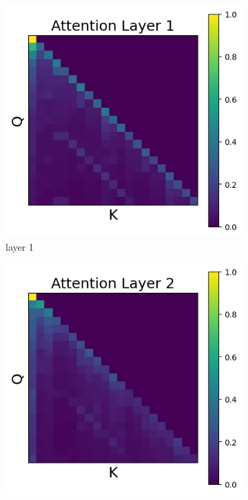 \documentclass[11pt]{article}
\begin{document}
\subsection{}\label{app:intervention2}
\begin{figure}[t]
  \begin{subfigure}[t]{0.24\textwidth}
    \centering
    \includegraphics[width=1.4\columnwidth]{figures/intervention2/layer_1.png}
    \caption{layer 1}
  \end{subfigure}\hfill
  \begin{subfigure}[t]{0.24\textwidth}
    \centering
    \includegraphics[width=1.4\columnwidth]{figures/intervention2/layer_2.png}

\end{subfigure}
\end{figure}
\end{document}
